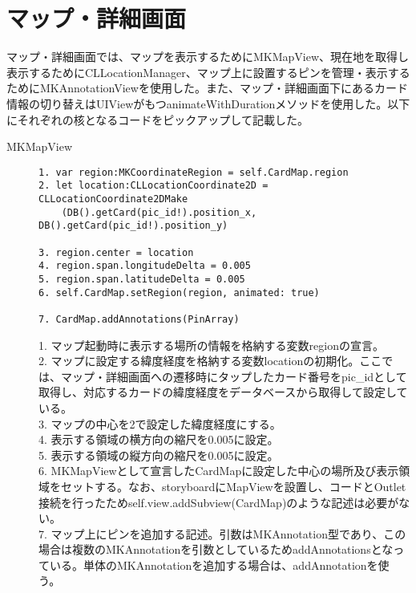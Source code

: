 \section{マップ・詳細画面}
マップ・詳細画面では、マップを表示するためにMKMapView、現在地を取得し表示するためにCLLocationManager、マップ上に設置するピンを管理・表示するためにMKAnnotationViewを使用した。また、マップ・詳細画面下にあるカード情報の切り替えはUIViewがもつanimateWithDurationメソッドを使用した。以下にそれぞれの核となるコードをピックアップして記載した。

\begin{description}
\item[MKMapView]\mbox{} 
\begin{lstlisting}[basicstyle=\ttfamily\footnotesize, frame=single]
1. var region:MKCoordinateRegion = self.CardMap.region
2. let location:CLLocationCoordinate2D = CLLocationCoordinate2DMake
    (DB().getCard(pic_id!).position_x, DB().getCard(pic_id!).position_y)

3. region.center = location
4. region.span.longitudeDelta = 0.005
5. region.span.latitudeDelta = 0.005
6. self.CardMap.setRegion(region, animated: true)

7. CardMap.addAnnotations(PinArray)
 \end{lstlisting}

1. マップ起動時に表示する場所の情報を格納する変数regionの宣言。 \\
2. マップに設定する緯度経度を格納する変数locationの初期化。ここでは、マップ・詳細画面への遷移時にタップしたカード番号をpic\_idとして取得し、対応するカードの緯度経度をデータベースから取得して設定している。\\
3. マップの中心を2で設定した緯度経度にする。\\
4. 表示する領域の横方向の縮尺を0.005に設定。 \\
5. 表示する領域の縦方向の縮尺を0.005に設定。 \\
6. MKMapViewとして宣言したCardMapに設定した中心の場所及び表示領域をセットする。なお、storyboardにMapViewを設置し、コードとOutlet接続を行ったためself.view.addSubview(CardMap)のような記述は必要がない。\\
7. マップ上にピンを追加する記述。引数はMKAnnotation型であり、この場合は複数のMKAnnotationを引数としているためaddAnnotationsとなっている。単体のMKAnnotationを追加する場合は、addAnnotationを使う。 \\
\end{description}

